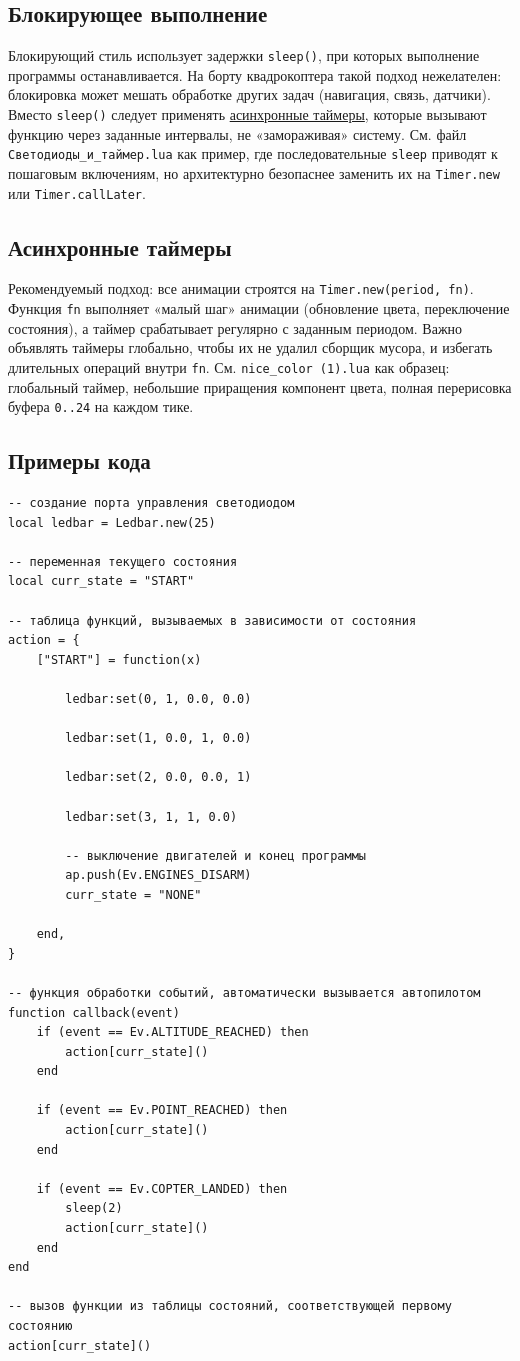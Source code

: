 \subsection{Блокирующее выполнение}
Блокирующий стиль использует задержки \verb|sleep()|, при которых выполнение программы останавливается. 
На борту квадрокоптера такой подход нежелателен: блокировка может мешать обработке других задач (навигация, связь, датчики). 
Вместо \verb|sleep()| следует применять \hyperlink{term:timer}{асинхронные таймеры}, которые вызывают функцию через заданные интервалы, не «замораживая» систему. 
См. файл \verb|Светодиоды_и_таймер.lua| как пример, где последовательные \verb|sleep| приводят к пошаговым включениям, но архитектурно безопаснее заменить их на \verb|Timer.new| или \verb|Timer.callLater|.
\subsection{Асинхронные таймеры}
Рекомендуемый подход: все анимации строятся на \verb|Timer.new(period, fn)|. 
Функция \verb|fn| выполняет «малый шаг» анимации (обновление цвета, переключение состояния), а таймер срабатывает регулярно с заданным периодом. 
Важно объявлять таймеры глобально, чтобы их не удалил сборщик мусора, и избегать длительных операций внутри \verb|fn|. 
См. \verb|nice_color (1).lua| как образец: глобальный таймер, небольшие приращения компонент цвета, полная перерисовка буфера \verb|0..24| на каждом тике.

\subsection{Примеры кода}
\begin{verbatim}
-- создание порта управления светодиодом
local ledbar = Ledbar.new(25)

-- переменная текущего состояния
local curr_state = "START"

-- таблица функций, вызываемых в зависимости от состояния
action = {
	["START"] = function(x)

		ledbar:set(0, 1, 0.0, 0.0)

		ledbar:set(1, 0.0, 1, 0.0)

		ledbar:set(2, 0.0, 0.0, 1)

		ledbar:set(3, 1, 1, 0.0)

		-- выключение двигателей и конец программы
		ap.push(Ev.ENGINES_DISARM)
		curr_state = "NONE"

	end,
}

-- функция обработки событий, автоматически вызывается автопилотом
function callback(event)
	if (event == Ev.ALTITUDE_REACHED) then
		action[curr_state]()
	end

	if (event == Ev.POINT_REACHED) then
		action[curr_state]()
	end

	if (event == Ev.COPTER_LANDED) then
		sleep(2)
		action[curr_state]()
	end
end

-- вызов функции из таблицы состояний, соответствующей первому состоянию
action[curr_state]()
\end{verbatim}

